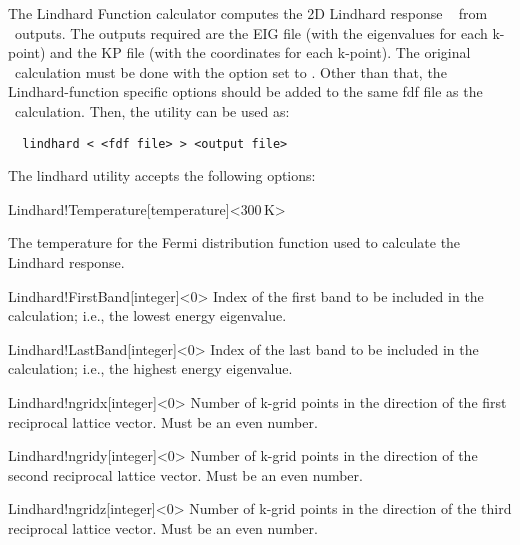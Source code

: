 The Lindhard Function calculator computes the 2D Lindhard response
~\cite{doi:10.1088/1361-648X/ab8522} from \siesta\ outputs. The outputs
required are the EIG file (with the eigenvalues for each k-point) and the KP
file (with the coordinates for each k-point). The original \siesta\ calculation
must be done with the  option set to
\fdffalse. Other than that, the Lindhard-function specific options should be
added to the same fdf file as the \siesta\ calculation. Then, the utility can be
used as:

\begin{verbatim}
  lindhard < <fdf file> > <output file>
\end{verbatim}

The lindhard utility accepts the following options:

\begin{fdfentry}{Lindhard!Temperature}[temperature]<$300\,\mathrm{K}$>

  The temperature for the Fermi distribution function used to calculate the
  Lindhard response.
\end{fdfentry}

\begin{fdfentry}{Lindhard!FirstBand}[integer]<$0$>
    Index of the first band to be included in the calculation; i.e., the lowest
    energy eigenvalue.
\end{fdfentry}

\begin{fdfentry}{Lindhard!LastBand}[integer]<$0$>
    Index of the last band to be included in the calculation; i.e., the highest
    energy eigenvalue.
\end{fdfentry}

\begin{fdfentry}{Lindhard!ngridx}[integer]<$0$>
    Number of k-grid points in the direction of the first reciprocal lattice
    vector. Must be an even number.
\end{fdfentry}

\begin{fdfentry}{Lindhard!ngridy}[integer]<$0$>
    Number of k-grid points in the direction of the second reciprocal lattice
    vector. Must be an even number.
\end{fdfentry}

\begin{fdfentry}{Lindhard!ngridz}[integer]<$0$>
    Number of k-grid points in the direction of the third reciprocal lattice
    vector. Must be an even number.
\end{fdfentry}

